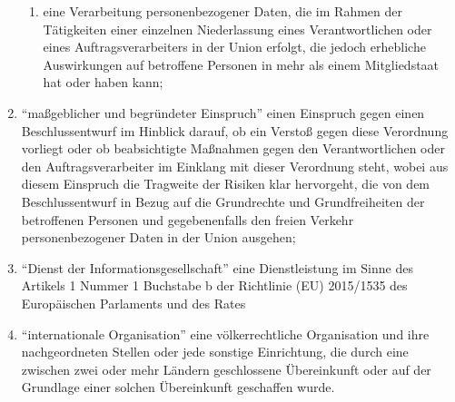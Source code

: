 \documentclass[A4, 12pt]{scrbook}
\begin{document}
\begin{enumerate}[label=\arabic*.]
\begin{enumerate}[label=\alph*)]
                    \item eine Verarbeitung personenbezogener Daten, die im Rahmen der Tätigkeiten einer einzelnen Niederlassung eines Verantwortlichen oder eines Auftragsverarbeiters in der Union erfolgt, die jedoch erhebliche Auswirkungen auf betroffene Personen in mehr als einem Mitgliedstaat hat oder haben kann;
                \end{enumerate}              
            \item ``maßgeblicher und begründeter Einspruch'' einen Einspruch gegen einen Beschlussentwurf im Hinblick darauf, ob ein Verstoß gegen diese Verordnung vorliegt oder ob beabsichtigte Maßnahmen gegen den Verantwortlichen oder den Auftragsverarbeiter im Einklang mit dieser Verordnung steht, wobei aus diesem Einspruch die Tragweite der Risiken klar hervorgeht, die von dem Beschlussentwurf in Bezug auf die Grundrechte und Grundfreiheiten der betroffenen Personen und gegebenenfalls den freien Verkehr personenbezogener Daten in der Union ausgehen;
            \item ``Dienst der Informationsgesellschaft'' eine Dienstleistung im Sinne des Artikels 1 Nummer 1 Buchstabe b der Richtlinie (EU) 2015/1535 des Europäischen Parlaments und des Rates 
            \item ``internationale Organisation'' eine völkerrechtliche Organisation und ihre nachgeordneten Stellen oder jede sonstige Einrichtung, die durch eine zwischen zwei oder mehr Ländern geschlossene Übereinkunft oder auf der Grundlage einer solchen Übereinkunft geschaffen wurde. 
        \end{enumerate}
\end{document}
